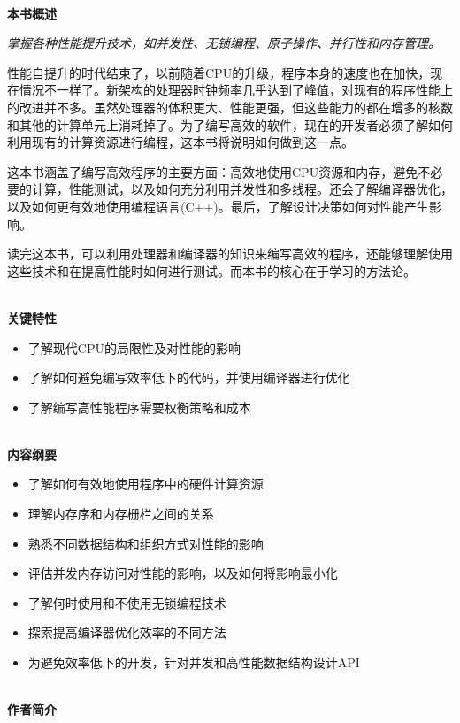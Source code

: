 \documentclass[11pt,a4paper,UTF8]{book}
\begin{document}
\hspace*{\fill} \\ %
\noindent\textbf{本书概述}

\textit{掌握各种性能提升技术，如并发性、无锁编程、原子操作、并行性和内存管理。}

性能自提升的时代结束了，以前随着CPU的升级，程序本身的速度也在加快，现在情况不一样了。新架构的处理器时钟频率几乎达到了峰值，对现有的程序性能上的改进并不多。虽然处理器的体积更大、性能更强，但这些能力的都在增多的核数和其他的计算单元上消耗掉了。为了编写高效的软件，现在的开发者必须了解如何利用现有的计算资源进行编程，这本书将说明如何做到这一点。

这本书涵盖了编写高效程序的主要方面：高效地使用CPU资源和内存，避免不必要的计算，性能测试，以及如何充分利用并发性和多线程。还会了解编译器优化，以及如何更有效地使用编程语言(C++)。最后，了解设计决策如何对性能产生影响。

读完这本书，可以利用处理器和编译器的知识来编写高效的程序，还能够理解使用这些技术和在提高性能时如何进行测试。而本书的核心在于学习的方法论。

\hspace*{\fill} \\ %
\noindent\textbf{关键特性}
\begin{itemize}
\item 了解现代CPU的局限性及对性能的影响
\item 了解如何避免编写效率低下的代码，并使用编译器进行优化
\item 了解编写高性能程序需要权衡策略和成本
\end{itemize}

\hspace*{\fill} \\ %
\noindent\textbf{内容纲要}
\begin{itemize}
\item 了解如何有效地使用程序中的硬件计算资源
\item 理解内存序和内存栅栏之间的关系
\item 熟悉不同数据结构和组织方式对性能的影响
\item 评估并发内存访问对性能的影响，以及如何将影响最小化
\item 了解何时使用和不使用无锁编程技术
\item 探索提高编译器优化效率的不同方法
\item 为避免效率低下的开发，针对并发和高性能数据结构设计API
\end{itemize}

\hspace*{\fill} \\ %
\noindent\textbf{作者简介}
\end{document}

